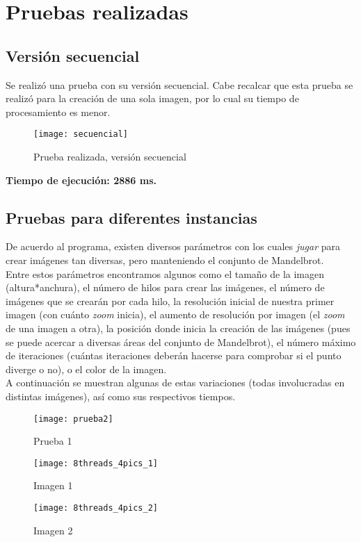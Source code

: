 \documentclass[12pt,a4paper]{article}
\begin{document}
	\section{Pruebas realizadas}
		\subsection{Versión secuencial}
			Se realizó una prueba con su versión secuencial. Cabe recalcar que esta prueba se realizó para la creación de una sola imagen, por lo cual su tiempo de procesamiento es menor.
			\begin{figure}[H]
				\centering
				\texttt{[image: secuencial]}
				\caption{Prueba realizada, versión secuencial}
			\end{figure}
			\textbf{Tiempo de ejecución: 2886 ms.}
			
		\subsection{Pruebas para diferentes instancias}
		De acuerdo al programa, existen diversos parámetros con los cuales \textit{jugar} para crear imágenes tan diversas, pero manteniendo el conjunto de Mandelbrot.\\
		Entre estos parámetros encontramos algunos como el tamaño de la imagen (altura*anchura), el número de hilos para crear las imágenes, el número de imágenes que se crearán por cada hilo, la resolución inicial de nuestra primer imagen (con cuánto \textit{zoom} inicia), el aumento de resolución por imagen (el \textit{zoom} de una imagen a otra), la posición donde inicia la creación de las imágenes (pues se puede acercar a diversas áreas del conjunto de Mandelbrot), el número máximo de iteraciones (cuántas iteraciones deberán hacerse para comprobar si el punto diverge o no), o el color de la imagen.\\
		A continuación se muestran algunas de estas variaciones (todas involucradas en distintas imágenes), así como sus respectivos tiempos.\\
		
		\begin{figure}[!htb]
			\texttt{[image: prueba2]}
			\caption{Prueba 1}
			\endminipage\hfill
			\texttt{[image: 8threads\_4pics\_1]}
			\caption{Imagen 1}
			\endminipage\hfill
			\texttt{[image: 8threads\_4pics\_2]}
			\caption{Imagen 2}
			\endminipage
		\end{figure}
		
\end{document}
